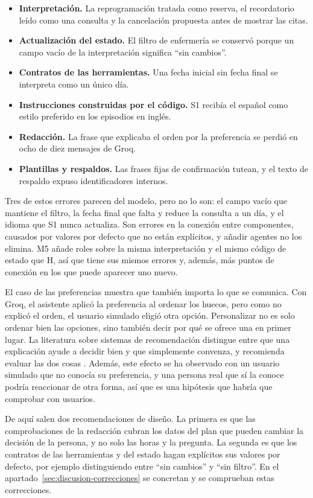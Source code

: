 \begin{itemize}
  \item \textbf{Interpretación.} La reprogramación tratada como reserva, el
  recordatorio leído como una consulta y la cancelación propuesta antes de
  mostrar las citas.
  \item \textbf{Actualización del estado.} El filtro de enfermería se conservó
  porque un campo vacío de la interpretación significa \enquote{sin cambios}.
  \item \textbf{Contratos de las herramientas.} Una fecha inicial sin fecha
  final se interpreta como un único día.
  \item \textbf{Instrucciones construidas por el código.} S1 recibía el
  español como estilo preferido en los episodios en inglés.
  \item \textbf{Redacción.} La frase que explicaba el orden por la preferencia
  se perdió en ocho de diez mensajes de Groq.
  \item \textbf{Plantillas y respaldos.} Las frases fijas de confirmación
  tutean, y el texto de respaldo expuso identificadores internos.
\end{itemize}

Tres de estos errores parecen del modelo, pero no lo son: el campo vacío que
mantiene el filtro, la fecha final que falta y reduce la consulta a un día, y
el idioma que S1 nunca actualiza. Son errores en la conexión entre componentes,
causados por valores por defecto que no están explícitos, y añadir agentes no
los elimina. M5 añade roles sobre la misma interpretación y el mismo código de
estado que H, así que tiene sus mismos errores y, además, más puntos de
conexión en los que puede aparecer uno nuevo.

El caso de las preferencias muestra que también importa lo que se comunica. Con
Groq, el asistente aplicó la preferencia al ordenar los huecos, pero como no
explicó el orden, el usuario simulado eligió otra opción. Personalizar no es
solo ordenar bien las opciones, sino también decir por qué se ofrece una en
primer lugar. La literatura sobre sistemas de recomendación distingue entre que
una explicación ayude a decidir bien y que simplemente convenza, y recomienda
evaluar las dos cosas \citep{tintarev2012explanations}. Además, este efecto se
ha observado con un usuario simulado que no conocía su preferencia, y una
persona real que sí la conoce podría reaccionar de otra forma, así que es una
hipótesis que habría que comprobar con usuarios.

De aquí salen dos recomendaciones de diseño. La primera es que las
comprobaciones de la redacción cubran los datos del plan que pueden cambiar la
decisión de la persona, y no solo las horas y la pregunta. La segunda es que los
contratos de las herramientas y del estado hagan explícitos sus valores por
defecto, por ejemplo distinguiendo entre \enquote{sin cambios} y \enquote{sin
filtro}. En el apartado~\ref{sec:discusion-correcciones} se concretan y se
comprueban estas correcciones.


